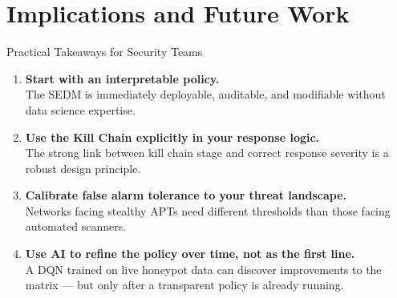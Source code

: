 \documentclass[aspectratio=169, 12pt]{beamer}
\begin{document}
\section{Implications and Future Work}

\begin{frame}{Practical Takeaways for Security Teams}
  \begin{enumerate}
    \item \textbf{Start with an interpretable policy.}\\
          The SEDM is immediately deployable, auditable, and modifiable without data science expertise.

    \vspace{0.3cm}
    \item \textbf{Use the Kill Chain explicitly in your response logic.}\\
          The strong link between kill chain stage and correct response severity is a robust design principle.

    \vspace{0.3cm}
    \item \textbf{Calibrate false alarm tolerance to your threat landscape.}\\
          Networks facing stealthy APTs need different thresholds than those facing automated scanners.

    \vspace{0.3cm}
    \item \textbf{Use AI to refine the policy over time, not as the first line.}\\
          A DQN trained on live honeypot data can discover improvements to the matrix — but only after a transparent policy is already running.
  \end{enumerate}
\end{frame}
\end{document}
